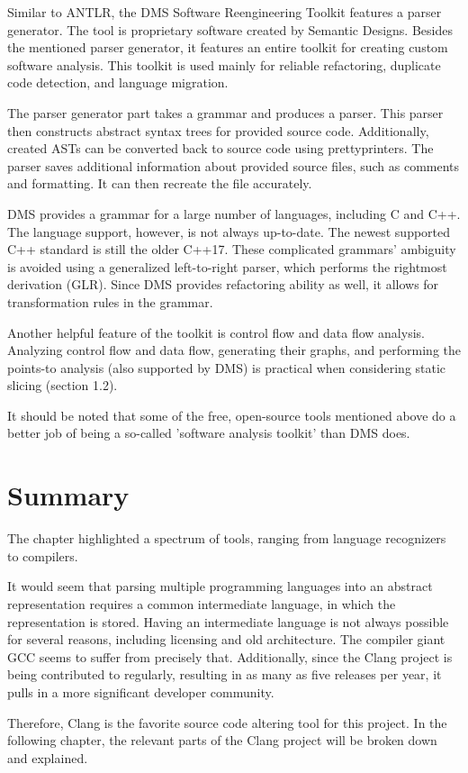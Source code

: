 Similar to ANTLR, the DMS Software Reengineering Toolkit features 
a parser generator.
The tool is proprietary software created by Semantic Designs.
Besides the mentioned parser generator, it features an entire toolkit for 
creating custom software analysis.
This toolkit is used mainly for reliable refactoring, duplicate code 
detection, and language migration.

The parser generator part takes a grammar and produces a parser.
This parser then constructs abstract syntax trees for provided source code.
Additionally, created ASTs can be converted back to source code using 
prettyprinters.
The parser saves additional information about provided source files, such as 
comments and formatting.
It can then recreate the file accurately.

DMS provides a grammar for a large number of languages, including C and C++.
The language support, however, is not always up-to-date.
The newest supported C++ standard is still the older C++17.
These complicated grammars' ambiguity is avoided using a generalized 
left-to-right parser, which performs the rightmost derivation (GLR).
Since DMS provides refactoring ability as well, it allows for transformation 
rules in the grammar.

Another helpful feature of the toolkit is control flow and data flow analysis.
Analyzing control flow and data flow, generating their graphs, and performing 
the points-to analysis (also supported by DMS) is practical when considering
static slicing (section 1.2).

It should be noted that some of the free, open-source tools mentioned above 
do a better job of being a so-called 'software analysis toolkit' than 
DMS does.

\section{Summary}

The chapter highlighted a spectrum of tools, ranging from language
recognizers to compilers.

It would seem that parsing multiple programming languages into an abstract 
representation requires a common intermediate language, in which 
the representation is stored. 
Having an intermediate language is not always possible for several reasons, 
including licensing and old architecture. 
The compiler giant GCC seems to suffer from precisely that.
Additionally, since the Clang project is being contributed to regularly, 
resulting in as many as five releases per year, 
it pulls in a more significant developer community. 

Therefore, Clang is the favorite source code altering tool for this project. 
In the following chapter, the relevant parts of the Clang project 
will be broken down and explained.
